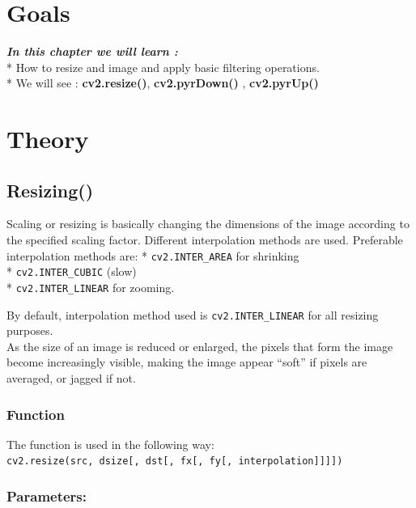 \documentclass[]{article}
\date{}
\begin{document}
\section{Goals}\label{goals}

\emph{\textbf{In this chapter we will learn :}}\\
* How to resize and image and apply basic filtering operations.\\
* We will see : \textbf{cv2.resize()}, \textbf{cv2.pyrDown()} ,
\textbf{cv2.pyrUp()}

\section{Theory}\label{theory}

\subsection{Resizing()}\label{resizing}

Scaling or resizing is basically changing the dimensions of the image
according to the specified scaling factor. Different interpolation
methods are used. Preferable interpolation methods are: *
\texttt{cv2.INTER\_AREA} for shrinking\\
 * \texttt{cv2.INTER\_CUBIC} (slow)\\
 * \texttt{cv2.INTER\_LINEAR} for zooming.

By default, interpolation method used is \texttt{cv2.INTER\_LINEAR} for
all resizing purposes.\\
As the size of an image is reduced or enlarged, the pixels that form the
image become increasingly visible, making the image appear ``soft'' if
pixels are averaged, or jagged if not.

\subsubsection{Function}\label{function}

The function is used in the following way:\\
\texttt{cv2.resize(src,\ dsize{[},\ dst{[},\ fx{[},\ fy{[},\ interpolation{]}{]}{]}{]})}

\subsubsection{Parameters:}\label{parameters}
\end{document}
